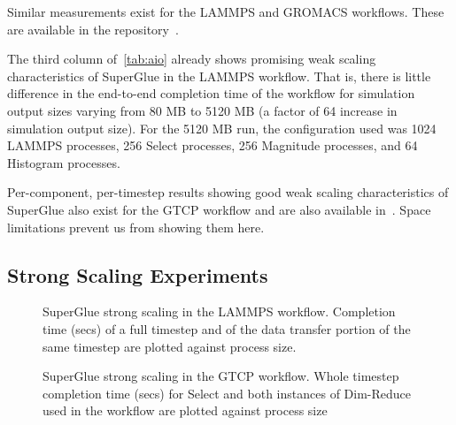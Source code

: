 Similar measurements exist for the LAMMPS and GROMACS workflows.
These are available in the repository~\cite{champsaur:superglue-repo}.

The third column of~\autoref{tab:aio} already
shows promising
weak scaling characteristics of SuperGlue
in the LAMMPS workflow. That is, there is little
difference in the end-to-end
completion time of the workflow
for simulation output sizes varying
from 80 MB to 5120 MB (a factor of 64
increase in simulation output size).
For the 5120 MB run, the configuration used
was 1024 LAMMPS processes, 256 Select processes,
256 Magnitude processes, and 64 Histogram processes.

Per-component, per-timestep results
showing good weak scaling characteristics of
SuperGlue
also exist for the GTCP workflow and are also
available in~\cite{champsaur:superglue-repo}.
Space limitations prevent us
from showing them here.

\subsection{Strong Scaling Experiments}


\begin{figure}
  \centering
  \vspace{-0.25in}
  
  \vspace{-0.15in}
  
  \vspace{-0.17in}
  
  \vspace{-0.05in}
  \caption{SuperGlue strong scaling in the LAMMPS workflow.
    Completion time (secs) of a full timestep and of the data transfer
    portion of the same timestep are plotted against process size.}
  \label{fig:lammps-strong}
  \vspace{-0.18in}
\end{figure}

\begin{figure}
  \centering
  \vspace{-0.17in}
  
  \vspace{-0.17in}
  
  \vspace{-0.06in}
  \caption{SuperGlue strong scaling in the GTCP workflow. Whole timestep
    completion time (secs) for Select and both instances of Dim-Reduce used in
    the workflow are plotted against process size}
  \label{fig:gtcp-strong}
  \vspace{-0.25in}
\end{figure}

